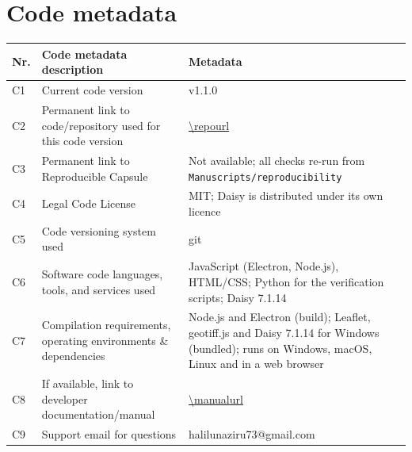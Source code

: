 \documentclass[preprint,12pt]{elsarticle}
\begin{document}
\section*{Code metadata}
\begin{table}[H]\centering\small
\begin{tabularx}{\textwidth}{lp{5.2cm}X}
\toprule
Nr. & Code metadata description & Metadata\\\midrule
C1 & Current code version & v1.1.0\\
C2 & Permanent link to code/repository used for this code version & \url{\repourl}\\
C3 & Permanent link to Reproducible Capsule & Not available; all checks re-run from \texttt{Manuscripts/reproducibility}\\
C4 & Legal Code License & MIT; Daisy is distributed under its own licence\\
C5 & Code versioning system used & git\\
C6 & Software code languages, tools, and services used & JavaScript (Electron, Node.js), HTML/CSS; Python for the verification scripts; Daisy 7.1.14\\
C7 & Compilation requirements, operating environments \& dependencies & Node.js and Electron (build); Leaflet, geotiff.js and Daisy 7.1.14 for Windows (bundled); runs on Windows, macOS, Linux and in a web browser\\
C8 & If available, link to developer documentation/manual & \url{\manualurl}\\
C9 & Support email for questions & halilunaziru73@gmail.com\\\bottomrule
\end{tabularx}
\end{table}
\end{document}
